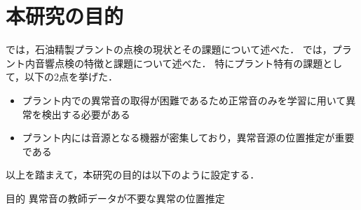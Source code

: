 \documentclass[../main]{subfiles}
\begin{document}
\section{本研究の目的}
\label{sec:intro_my_purpose}
では，石油精製プラントの点検の現状とその課題について述べた．
では，プラント内音響点検の特徴と課題について述べた．
特にプラント特有の課題として，以下の2点を挙げた．

\begin{itemize}
  \item プラント内での異常音の取得が困難であるため正常音のみを学習に用いて異常を検出する必要がある
  \item プラント内には音源となる機器が密集しており，異常音源の位置推定が重要である
\end{itemize}

以上を踏まえて，本研究の目的は以下のように設定する．

\bigskip
\begin{itembox}[c]{目的}
  \centering
  異常音の教師データが不要な異常の位置推定
\end{itembox}
\end{document}
